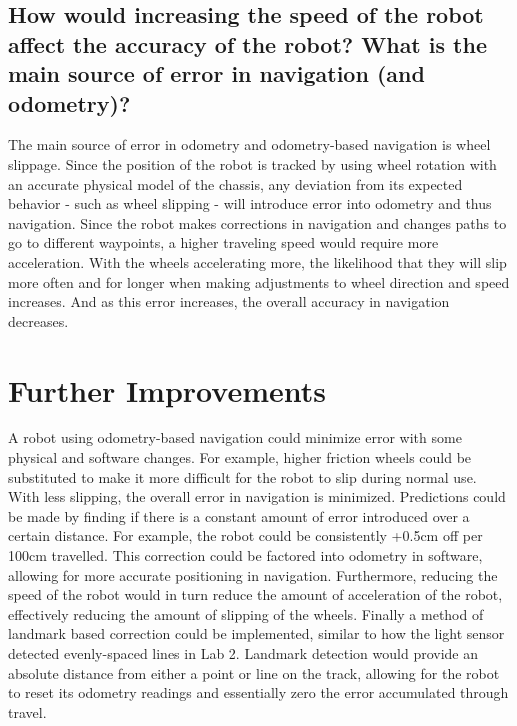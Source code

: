 \documentclass[11pt]{article}
\begin{document}
\subsection{How would increasing the speed of the robot affect the accuracy of the robot? What is
the main source of error in navigation (and odometry)?}
The main source of error in odometry and odometry-based navigation is wheel slippage. Since the
position of the robot is tracked by using wheel rotation with an accurate physical model of the
chassis, any deviation from its expected behavior - such as wheel slipping - will introduce error
into odometry and thus navigation. Since the robot makes corrections in navigation and changes paths
to go to different waypoints, a higher traveling speed would require more acceleration. With the
wheels accelerating more, the likelihood that they will slip more often and for longer when making
adjustments to wheel direction and speed increases. And as this error increases, the overall
accuracy in navigation decreases.

\section{Further Improvements}
A robot using odometry-based navigation could minimize error with some physical and software
changes. For example, higher friction wheels could be substituted to make it more difficult for the
robot to slip during normal use. With less slipping, the overall error in navigation is minimized.
Predictions could be made by finding if there is a constant amount of error introduced over a
certain distance. For example, the robot could be consistently +0.5cm off per 100cm travelled. This
correction could be factored into odometry in software, allowing for more accurate positioning in
navigation. Furthermore, reducing the speed of the robot would in turn reduce the amount of
acceleration of the robot, effectively reducing the amount of slipping of the wheels. Finally a
method of landmark based correction could be implemented, similar to how the light
sensor detected evenly-spaced lines in Lab 2. Landmark detection would provide an absolute distance
from either a point or line on the track, allowing for the robot to reset its odometry readings and
essentially zero the error accumulated through travel.
\end{document}
